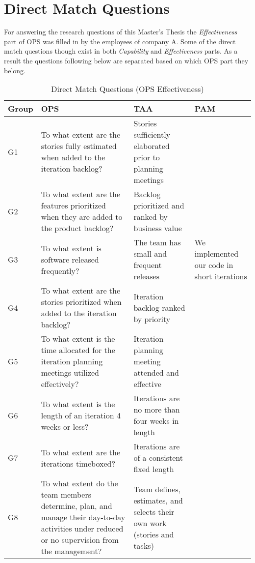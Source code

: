 \chapter{Direct Match Questions}
\label{ch:direct_match_questions}

For answering the research questions of this Master's Thesis the \textit{Effectiveness} part of \ac{OPS} was filled in by the employees of company A. Some of the direct match questions though exist in both \textit{Capability} and \textit{Effectiveness} parts. As a result the questions following below are separated based on which \ac{OPS} part they belong.

\begin{longtable} {| p{1.5cm} | p{4.8cm} | p{3.8cm} | p{3.3cm} |} \caption{Direct Match Questions (OPS Effectiveness)} \\ \hline
	\label{table:direct_match_table_effectiveness} 	
		\textbf{Group} & \textbf{OPS} & \textbf{TAA}  & \textbf{PAM} \\ \hline \endhead
		\label{G1} G1 & To what extent are the stories fully estimated when added to the iteration backlog? & Stories sufficiently elaborated prior to planning meetings & \\ \hline
		\label{G2} G2 & To what extent are the features prioritized when they are added to the product backlog? & Backlog prioritized and ranked by business value & \\ \hline
		\label{G3} G3 & To what extent is software released frequently? & The team has small and frequent releases & We implemented our code in short iterations \\ \hline
		\label{G4} G4 & To what extent are the stories prioritized when added to the iteration backlog? & Iteration backlog ranked by priority & \\ \hline
		\label{G5} G5 & To what extent is the time allocated for the iteration planning meetings utilized effectively? & Iteration planning meeting attended and effective & \\ \hline
		\label{G6} G6 & To what extent is the length of an iteration 4 weeks or less? & Iterations are no more than four weeks in length & \\ \hline
		\label{G7} G7 & To what extent are the iterations timeboxed? & Iterations are of a consistent fixed length &  \\ \hline
		\label{G8} G8 & To what extent do the team members determine, plan, and manage their day-to-day activities under reduced or no supervision from the management? & Team defines, estimates, and selects their own work (stories and tasks) &  \\ \hline

\end{longtable}
